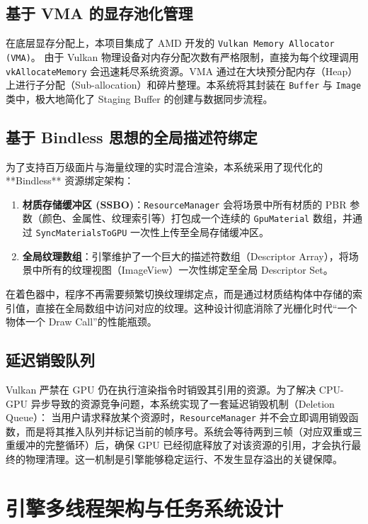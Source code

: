 \subsection{基于 VMA 的显存池化管理}
在底层显存分配上，本项目集成了 AMD 开发的 \texttt{Vulkan Memory Allocator (VMA)}。
由于 Vulkan 物理设备对内存分配次数有严格限制，直接为每个纹理调用 \texttt{vkAllocateMemory} 会迅速耗尽系统资源。VMA 通过在大块预分配内存（Heap）上进行子分配（Sub-allocation）和碎片整理。本系统将其封装在 \texttt{Buffer} 与 \texttt{Image} 类中，极大地简化了 Staging Buffer 的创建与数据同步流程。


\subsection{基于 Bindless 思想的全局描述符绑定}
为了支持百万级面片与海量纹理的实时混合渲染，本系统采用了现代化的 **Bindless** 资源绑定架构：
\begin{enumerate}
    \item \textbf{材质存储缓冲区 (SSBO)}：\texttt{ResourceManager} 会将场景中所有材质的 PBR 参数（颜色、金属性、纹理索引等）打包成一个连续的 \texttt{GpuMaterial} 数组，并通过 \texttt{SyncMaterialsToGPU} 一次性上传至全局存储缓冲区。
    \item \textbf{全局纹理数组}：引擎维护了一个巨大的描述符数组（Descriptor Array），将场景中所有的纹理视图（ImageView）一次性绑定至全局 Descriptor Set。
\end{enumerate}
在着色器中，程序不再需要频繁切换纹理绑定点，而是通过材质结构体中存储的索引值，直接在全局数组中访问对应的纹理。这种设计彻底消除了光栅化时代“一个物体一个 Draw Call”的性能瓶颈。

\subsection{延迟销毁队列 }
Vulkan 严禁在 GPU 仍在执行渲染指令时销毁其引用的资源。为了解决 CPU-GPU 异步导致的资源竞争问题，本系统实现了一套延迟销毁机制（Deletion Queue）：
当用户请求释放某个资源时，\texttt{ResourceManager} 并不会立即调用销毁函数，而是将其推入队列并标记当前的帧序号。系统会等待两到三帧（对应双重或三重缓冲的完整循环）后，确保 GPU 已经彻底释放了对该资源的引用，才会执行最终的物理清理。这一机制是引擎能够稳定运行、不发生显存溢出的关键保障。

\section{引擎多线程架构与任务系统设计}

